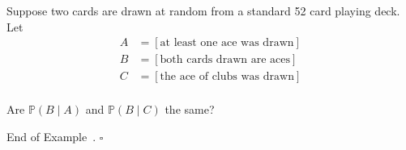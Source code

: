 \documentclass[10pt]{article}
\theoremstyle{definition}
\newtheorem{example}[theorem]{Example}
\renewenvironment{example}
{\begin{oldexample}}
  {\par\smallskip\hfill   End of Example~\theexample. $\square$    \par\end{oldexample}}
\newcommand{\1}[1]{\textbf{1}_{\left[#1\right]}} %
\def\P{\mathbb{P}} %
\DeclareRobustCommand{\demph}[1]{%
  \ifmmode
  {\color{Blue}#1}%
  \else
  {\color{Blue}\bfseries\slshape #1}%
  \fi
}
\begin{document}
\begin{example}
  Suppose two cards are drawn at random from a standard 52 card playing deck.
  Let
  \begin{align*}
    A &= \left[ \text{at least one ace was drawn} \right]\\
    B &= \left[ \text{both cards drawn are aces} \right]\\
    C &= \left[ \text{the ace of clubs was drawn} \right]\\
  \end{align*}

  Are $\P\left(B\mid A \right)$ and $\P \left( B\mid C \right)$ the same?
\end{example}

\newpage


\end{document}
